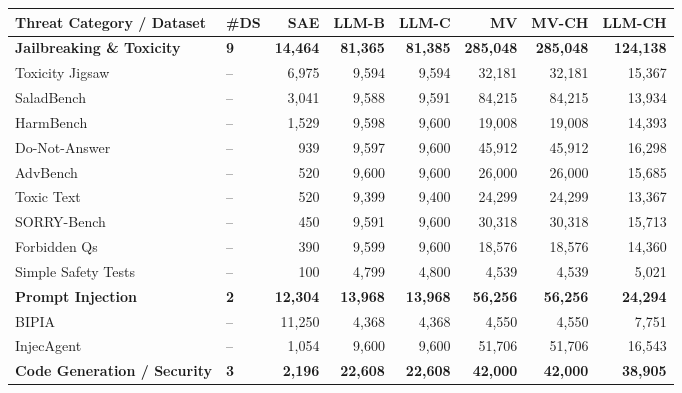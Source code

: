 \begin{table}[t]
\centering
\scriptsize
\setlength{\tabcolsep}{3pt}
\begin{tabular}{llrrrrrr}
\toprule
\textbf{Threat Category / Dataset} & \textbf{\#DS} & \textbf{SAE} & \textbf{LLM-B} & \textbf{LLM-C} & \textbf{MV} & \textbf{MV-CH} & \textbf{LLM-CH} \\
\midrule
\textbf{Jailbreaking \& Toxicity}     & \textbf{9}  & \textbf{14,464}  & \textbf{81,365}  & \textbf{81,385}  & \textbf{285,048}  & \textbf{285,048}  & \textbf{124,138} \\
\quad Toxicity Jigsaw~\cite{jigsaw2018toxic}              & -- & 6,975  & 9,594 & 9,594 & 32,181 & 32,181 & 15,367 \\
\quad SaladBench~\cite{li-etal-2024-salad}                & -- & 3,041  & 9,588 & 9,591 & 84,215 & 84,215 & 13,934 \\
\quad HarmBench~\cite{mazeika-etal-2024-harmbench}        & -- & 1,529  & 9,598 & 9,600 & 19,008 & 19,008 & 14,393 \\
\quad Do-Not-Answer~\cite{wang-etal-2024-answer}          & -- & 939    & 9,597 & 9,600 & 45,912 & 45,912 & 16,298 \\
\quad AdvBench~\cite{zou2023universal}                    & -- & 520    & 9,600 & 9,600 & 26,000 & 26,000 & 15,685 \\
\quad Toxic Text~\cite{hada-etal-2021-ruddit}             & -- & 520    & 9,399 & 9,400 & 24,299 & 24,299 & 13,367 \\
\quad SORRY-Bench~\cite{xie2024sorrybench}                & -- & 450    & 9,591 & 9,600 & 30,318 & 30,318 & 15,713 \\
\quad Forbidden Qs~\cite{shen-etal-2024-doanythingnow}    & -- & 390    & 9,599 & 9,600 & 18,576 & 18,576 & 14,360 \\
\quad Simple Safety Tests~\cite{vidgen2024simplesafetytests} & -- & 100 & 4,799 & 4,800 & 4,539  & 4,539  & 5,021  \\
\midrule
\textbf{Prompt Injection}             & \textbf{2}  & \textbf{12,304}  & \textbf{13,968}  & \textbf{13,968}  & \textbf{56,256}   & \textbf{56,256}   & \textbf{24,294}  \\
\quad BIPIA~\cite{yi2024bipia}                            & -- & 11,250 & 4,368 & 4,368 & 4,550  & 4,550  & 7,751  \\
\quad InjecAgent~\cite{zhan-etal-2024-injecagent}         & -- & 1,054  & 9,600 & 9,600 & 51,706 & 51,706 & 16,543 \\
\midrule
\textbf{Code Generation / Security}   & \textbf{3}  & \textbf{2,196}   & \textbf{22,608}  & \textbf{22,608}  & \textbf{42,000}   & \textbf{42,000}   & \textbf{38,905}  \\

\end{tabular}
\end{table}
